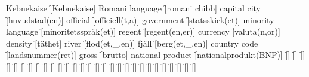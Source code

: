\begin{questions}
\begin{multicols}{2}
        \question Kebnekaise \f[Kebnekaise]
        \question Romani language \f[romani chibb]
        \question capital city \f[huvudstad(en)]
        \question official \f[officiell(t,a)]
        \question government \f[statsskick(et)]
        \question minority language \f[minoritetsspråk(et)]
        \question regent \f[regent(en,er)]
        \question currency \f[valuta(n,or)]
        \question density \f[täthet]
        \question river \f[flod(et,\_,en)]
        \question fjäll \f[berg(et,\_,en)]
        \question country code \f[landsnummer(ret)]
        \question gross \f[brutto]
        \question national product \f[nationalprodukt(BNP)]
        \question  \f[]
        \question  \f[]
        \question  \f[]
        \question  \f[]
        \question  \f[]
        \question  \f[]
        \question  \f[]
        \question  \f[]
        \question  \f[]
        \question  \f[]
        \question  \f[]
        \question  \f[]
        \question  \f[]
        \question  \f[]
        \question  \f[]
        \question  \f[]
        \question  \f[]
        \question  \f[]
        \question  \f[]
        \question  \f[]
        \question  \f[]
        \question  \f[]
        \question  \f[]
        \question  \f[]
        \question  \f[]
        \question  \f[]
        \question  \f[]
        \question  \f[]
        \question  \f[]
    \end{multicols}
\end{questions}
